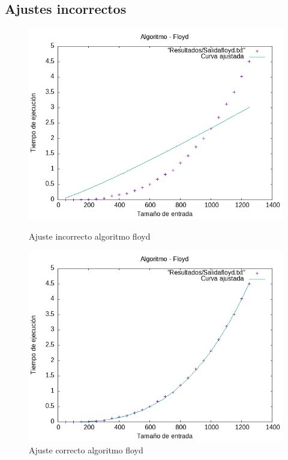 \documentclass[11pt]{article}
\begin{document}
\subsection{Ajustes incorrectos}
\begin{figure}[H]
    \begin{minipage}{0.5\textwidth}
        \centering
        \includegraphics[width=\linewidth]{assets/AjusteIncorrecto/Floyd_hib.png}
        \caption{Ajuste incorrecto algoritmo floyd}
        \label{fig:floyd}
    \end{minipage}%
    \begin{minipage}{0.5\textwidth}
        \centering
        \includegraphics[width=\linewidth]{assets/AjusteHibrido_latex/Hibrido_fibonacci_floyd_hanoi/Floyd_hib.png}
        \caption{Ajuste correcto algoritmo floyd}
        \label{fig:floyd}
    \end{minipage}
\end{figure}
\end{document}
